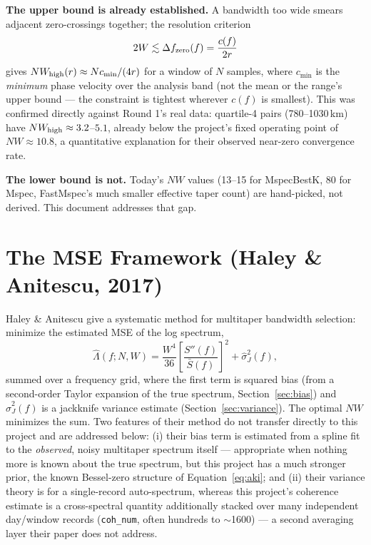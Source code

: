 \documentclass[11pt]{article}
\begin{document}
\textbf{The upper bound is already established.} A bandwidth too wide smears adjacent
zero-crossings together; the resolution criterion
\begin{equation}
  2W \lesssim \Delta f_{\rm zero}(f) = \frac{c(f)}{2r}
  \label{eq:resolution}
\end{equation}
gives $NW_{\rm high}(r) \approx Nc_{\min}/(4r)$ for a window of $N$ samples, where $c_{\min}$ is
the \emph{minimum} phase velocity over the analysis band (not the mean or the range's upper
bound --- the constraint is tightest wherever $c(f)$ is smallest). This was confirmed directly
against Round 1's real data: quartile-4 pairs (780--1030\,km) have $NW_{\rm high}\approx
3.2$--$5.1$, already below the project's fixed operating point of $NW\approx 10.8$, a
quantitative explanation for their observed near-zero convergence rate.

\textbf{The lower bound is not.} Today's $NW$ values (13--15 for MspecBestK, 80 for Mspec,
FastMspec's much smaller effective taper count) are hand-picked, not derived. This document
addresses that gap.

\section{The MSE Framework (Haley \& Anitescu, 2017)}

Haley \& Anitescu \cite{haley2017} give a systematic method for multitaper bandwidth selection:
minimize the estimated MSE of the log spectrum,
\begin{equation}
  \hat\Lambda(f; N, W) = \frac{W^4}{36}\left[\frac{S''(f)}{\bar S(f)}\right]^2 +
  \hat\sigma_J^2(f),
  \label{eq:mse}
\end{equation}
summed over a frequency grid, where the first term is squared bias (from a second-order Taylor
expansion of the true spectrum, Section~\ref{sec:bias}) and $\hat\sigma_J^2(f)$ is a jackknife
variance estimate (Section~\ref{sec:variance}). The optimal $NW$ minimizes the sum. Two features
of their method do not transfer directly to this project and are addressed below: (i) their bias
term is estimated from a spline fit to the \emph{observed}, noisy multitaper spectrum itself
--- appropriate when nothing more is known about the true spectrum, but this project has a much
stronger prior, the known Bessel-zero structure of Equation~\ref{eq:aki}; and (ii) their variance
theory is for a single-record auto-spectrum, whereas this project's coherence estimate is a
cross-spectral quantity additionally stacked over many independent day/window records
(\texttt{coh\_num}, often hundreds to $\sim$1600) --- a second averaging layer their paper does
not address.
\end{document}
